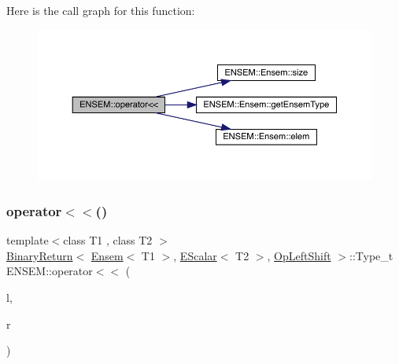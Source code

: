 Here is the call graph for this function\+:\nopagebreak
\begin{figure}[H]
\begin{center}
\leavevmode
\includegraphics[width=350pt]{d1/d9e/group__eensem_ga822a79ca0b7e9ffdd3c9fbfaad909967_cgraph}
\end{center}
\end{figure}
\mbox{\label{group__eensem_ga6651d0e3a61fd80d621e17a1ae4496af}} 
\subsubsection{\texorpdfstring{operator$<$$<$()}{operator<<()}\hspace{0.1cm}{\footnotesize\ttfamily [3/4]}}
{\footnotesize\ttfamily template$<$class T1 , class T2 $>$ \\
\mbox{\hyperlink{structENSEM_1_1BinaryReturn}{Binary\+Return}}$<$ \mbox{\hyperlink{classENSEM_1_1Ensem}{Ensem}}$<$ T1 $>$, \mbox{\hyperlink{classENSEM_1_1EScalar}{E\+Scalar}}$<$ T2 $>$, \mbox{\hyperlink{structENSEM_1_1OpLeftShift}{Op\+Left\+Shift}} $>$\+::Type\+\_\+t E\+N\+S\+E\+M\+::operator$<$$<$ (\begin{DoxyParamCaption}\item[{const \mbox{\hyperlink{classENSEM_1_1Ensem}{Ensem}}$<$ T1 $>$ \&}]{l,  }\item[{const \mbox{\hyperlink{classENSEM_1_1EScalar}{E\+Scalar}}$<$ T2 $>$ \&}]{r }\end{DoxyParamCaption})\hspace{0.3cm}{\ttfamily [inline]}}

